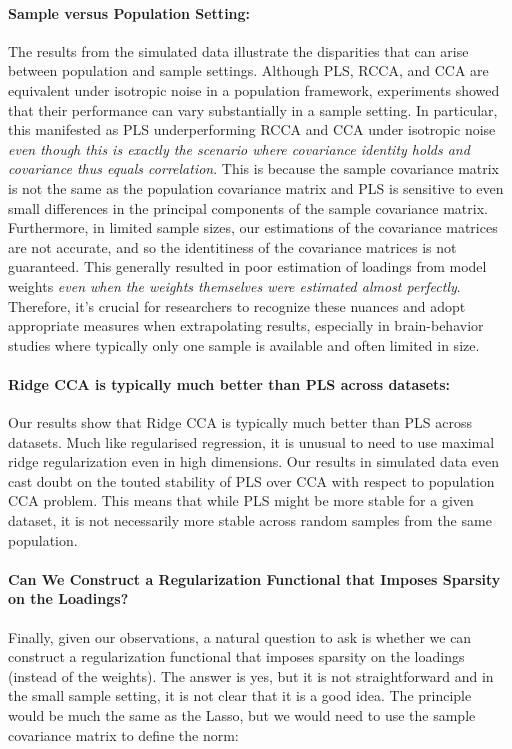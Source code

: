 \paragraph{Sample versus Population Setting:} The results from the simulated data illustrate the disparities that can arise between population and sample settings.
Although PLS, RCCA, and CCA are equivalent under isotropic noise in a population framework, experiments showed that their performance can vary substantially in a sample setting.
In particular, this manifested as PLS underperforming RCCA and CCA under isotropic noise \textit{even though this is exactly the scenario where covariance identity holds and covariance thus equals correlation}.
This is because the sample covariance matrix is not the same as the population covariance matrix and PLS is sensitive to even small differences in the principal components of the sample covariance matrix.
Furthermore, in limited sample sizes, our estimations of the covariance matrices are not accurate, and so the identitiness of the covariance matrices is not guaranteed.
This generally resulted in poor estimation of loadings from model weights \textit{even when the weights themselves were estimated almost perfectly}.
Therefore, it's crucial for researchers to recognize these nuances and adopt appropriate measures when extrapolating results, especially in brain-behavior studies where typically only one sample is available and often limited in size.

\paragraph{Ridge CCA is typically much better than PLS across datasets:} Our results show that Ridge CCA is typically much better than PLS across datasets.
Much like regularised regression, it is unusual to need to use maximal ridge regularization even in high dimensions.
Our results in simulated data even cast doubt on the touted stability of PLS over CCA with respect to population CCA problem.
This means that while PLS might be more stable for a given dataset, it is not necessarily more stable across random samples from the same population.

\paragraph{Can We Construct a Regularization Functional that Imposes Sparsity on the Loadings?}
Finally, given our observations, a natural question to ask is whether we can construct a regularization functional that imposes sparsity on the loadings (instead of the weights).
The answer is yes, but it is not straightforward and in the small sample setting, it is not clear that it is a good idea.
The principle would be much the same as the Lasso, but we would need to use the sample covariance matrix to define the norm:

